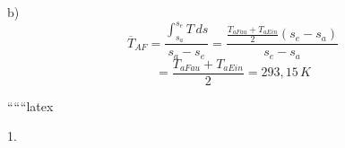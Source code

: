 b)
\[
\overline{T}_{AF} = \frac{\int_{s_a}^{s_e} T \, ds}{s_a - s_e} = \frac{\frac{T_{aFau} + T_{aEin}}{2} (s_e - s_a)}{s_e - s_a}
\]
\[
= \frac{T_{aFau} + T_{aEin}}{2} = 293,15 \, K
\]

``````latex


1.